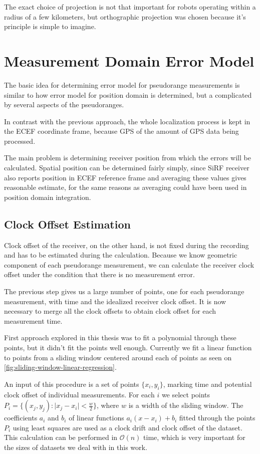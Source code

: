 The exact choice of projection is not that important for robots operating within
a radius of a few kilometers, but orthographic projection was chosen because
it's principle is simple to imagine.

\section{Measurement Domain Error Model}
The basic idea for determining error model for pseudorange measurements is
similar to how error model for position domain is determined, but a complicated
by several aspects of the pseudoranges.

In contrast with the previous approach, the whole localization process is kept in
the ECEF coordinate frame, because GPS of the amount of GPS data being processed.

The main problem is determining receiver position from which the errors will be
calculated.
Spatial position can be determined fairly simply, since SiRF receiver also
reports position in ECEF reference frame and averaging these values gives
reasonable estimate, for the same reasons as averaging could have been used in
position domain integration.

\subsection{Clock Offset Estimation}
\label{sec:impl-clock-offsets}
Clock offset of the receiver, on the other hand, is not fixed during the recording
and has to be estimated during the calculation.
Because we know geometric component of each pseudorange measurement, we can
calculate the receiver clock offset under the condition that there is no measurement
error.

The previous step gives us a large number of points, one for each pseudorange
measurement, with time and the idealized receiver clock offset.
It is now necessary to merge all the clock offsets to obtain clock offset for
each measurement time.

First approach explored in this thesis was to fit a polynomial through these
points, but it didn't fit the points well enough.
Currently we fit a linear function to points from a sliding window centered
around each of points as seen on \cref{fig:sliding-window-linear-regression}.

An input of this procedure is a set of points \(\{x_i, y_i\}\), marking 
time and potential clock offset of individual measurements.
For each \(i\) we select points \(P_i = \{(x_j, y_j) : \lvert{}x_j - x_i\rvert < \frac{w}{2}\}\), where
\(w\) is a width of the sliding window.
The coefficients \(a_i\) and \(b_i\) of linear functions
\(a_i (x - x_i) + b_i\) fitted through the points \(P_i\) using least squares
are used as a clock drift and clock offset of the dataset.
This calculation can be performed in \(\mathcal{O}(n)\) time, which is very
important for the sizes of datasets we deal with in this work.


